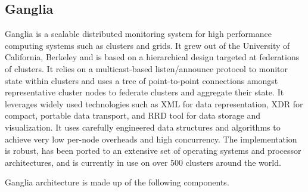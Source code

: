\subsection{Ganglia}
Ganglia\cite{ganglia} is a scalable distributed monitoring system for high
performance computing systems such as clusters and grids. It grew out of the
University of California, Berkeley and is based on a hierarchical design
targeted at federations of clusters. It relies on a multicast-based
listen/announce protocol to monitor state within clusters and uses a tree of
point-to-point connections amongst representative cluster nodes to federate
clusters and aggregate their state. It leverages widely used technologies such
as XML for data representation, XDR for compact, portable data transport, and
RRD tool for data storage and visualization. It uses carefully engineered data
structures and algorithms to achieve very low per-node overheads and high
concurrency. The implementation is robust, has been ported to an extensive set
of operating systems and processor architectures, and is currently in use on
over 500 clusters around the world. 


Ganglia architecture is made up of the following components.

